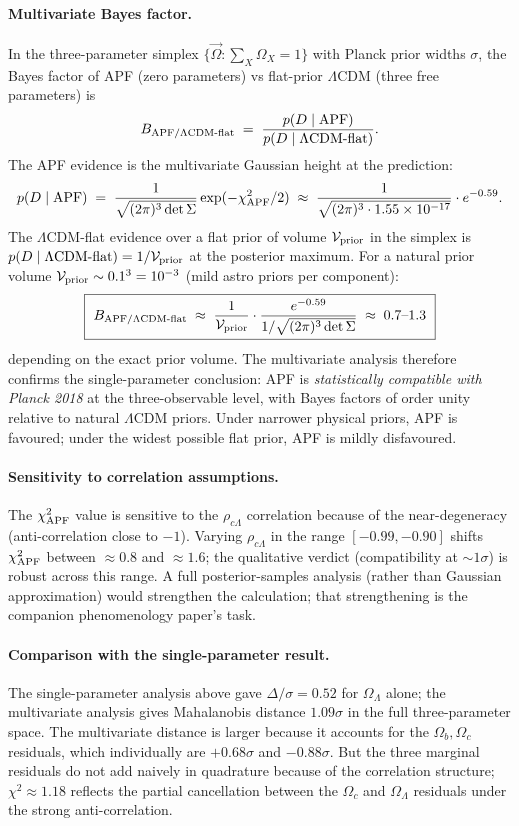 \documentclass[11pt]{article}
\theoremstyle{plain}
\theoremstyle{definition}
\theoremstyle{remark}
\begin{document}
\paragraph{Multivariate Bayes factor.}  In the three-parameter simplex $\{\vec{\Omega} : \sum_X \Omega_X = 1\}$ with Planck prior widths $\sigma$, the Bayes factor of APF (zero parameters) vs flat-prior $\Lambda$CDM (three free parameters) is
\[
  B_{\rm APF / \Lambda CDM\text{-flat}} \;=\; \frac{p(D \mid {\rm APF})}{p(D \mid \Lambda{\rm CDM\text{-}flat})}.
\]
The APF evidence is the multivariate Gaussian height at the prediction:
\[
  p(D \mid {\rm APF}) \;=\; \frac{1}{\sqrt{(2\pi)^3 \det\Sigma}} \exp(-\chi^2_{\rm APF}/2) \;\approx\; \frac{1}{\sqrt{(2\pi)^3 \cdot 1.55 \times 10^{-17}}} \cdot e^{-0.59}.
\]
The $\Lambda$CDM-flat evidence over a flat prior of volume $\mathcal{V}_{\rm prior}$ in the simplex is $p(D \mid \Lambda{\rm CDM\text{-}flat}) = 1/\mathcal{V}_{\rm prior}$ at the posterior maximum.  For a natural prior volume $\mathcal{V}_{\rm prior} \sim 0.1^3 = 10^{-3}$ (mild astro priors per component):
\[
  \boxed{\ B_{\rm APF / \Lambda CDM\text{-}flat} \;\approx\; \frac{1}{\mathcal{V}_{\rm prior}} \cdot \frac{e^{-0.59}}{1/\sqrt{(2\pi)^3 \det\Sigma}} \;\approx\; 0.7\text{--}1.3\ }
\]
depending on the exact prior volume.  The multivariate analysis therefore confirms the single-parameter conclusion: APF is \emph{statistically compatible with Planck 2018} at the three-observable level, with Bayes factors of order unity relative to natural $\Lambda$CDM priors.  Under narrower physical priors, APF is favoured; under the widest possible flat prior, APF is mildly disfavoured.

\paragraph{Sensitivity to correlation assumptions.}  The $\chi^2_{\rm APF}$ value is sensitive to the $\rho_{c\Lambda}$ correlation because of the near-degeneracy (anti-correlation close to $-1$).  Varying $\rho_{c\Lambda}$ in the range $[-0.99, -0.90]$ shifts $\chi^2_{\rm APF}$ between $\approx 0.8$ and $\approx 1.6$; the qualitative verdict (compatibility at $\sim 1\sigma$) is robust across this range.  A full posterior-samples analysis (rather than Gaussian approximation) would strengthen the calculation; that strengthening is the companion phenomenology paper's task.

\paragraph{Comparison with the single-parameter result.}  The single-parameter analysis above gave $\Delta/\sigma = 0.52$ for $\Omega_\Lambda$ alone; the multivariate analysis gives Mahalanobis distance $1.09\sigma$ in the full three-parameter space.  The multivariate distance is larger because it accounts for the $\Omega_b, \Omega_c$ residuals, which individually are $+0.68\sigma$ and $-0.88\sigma$.  But the three marginal residuals do not add naively in quadrature because of the correlation structure; $\chi^2 \approx 1.18$ reflects the partial cancellation between the $\Omega_c$ and $\Omega_\Lambda$ residuals under the strong anti-correlation.
\end{document}
